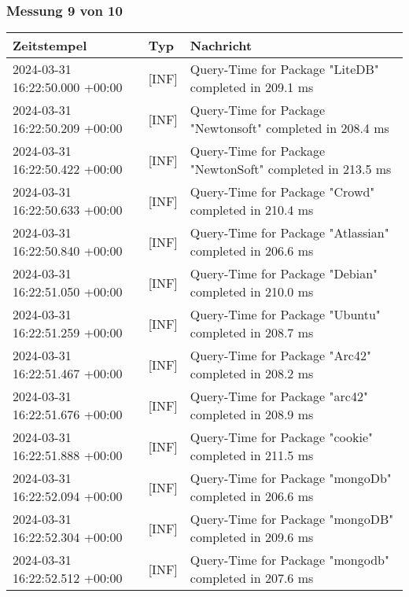     \subsubsection*{Messung 9 von 10} \label{subsubsec:MySQLOhneIndex9von10}
        {
            {\small
                \begin{tabularx}{\textwidth}{|l|l|X|}
                    \hline
                    \textbf{Zeitstempel} & \textbf{Typ} & \textbf{Nachricht} \\
                    \hline
                    \endhead
                    2024-03-31 16:22:50.000 +00:00 & [INF] & Query-Time for Package "LiteDB" completed in 209.1 ms \\
                    2024-03-31 16:22:50.209 +00:00 & [INF] & Query-Time for Package "Newtonsoft" completed in 208.4 ms \\
                    2024-03-31 16:22:50.422 +00:00 & [INF] & Query-Time for Package "NewtonSoft" completed in 213.5 ms \\
                    2024-03-31 16:22:50.633 +00:00 & [INF] & Query-Time for Package "Crowd" completed in 210.4 ms \\
                    2024-03-31 16:22:50.840 +00:00 & [INF] & Query-Time for Package "Atlassian" completed in 206.6 ms \\
                    2024-03-31 16:22:51.050 +00:00 & [INF] & Query-Time for Package "Debian" completed in 210.0 ms \\
                    2024-03-31 16:22:51.259 +00:00 & [INF] & Query-Time for Package "Ubuntu" completed in 208.7 ms \\
                    2024-03-31 16:22:51.467 +00:00 & [INF] & Query-Time for Package "Arc42" completed in 208.2 ms \\
                    2024-03-31 16:22:51.676 +00:00 & [INF] & Query-Time for Package "arc42" completed in 208.9 ms \\
                    2024-03-31 16:22:51.888 +00:00 & [INF] & Query-Time for Package "cookie" completed in 211.5 ms \\
                    2024-03-31 16:22:52.094 +00:00 & [INF] & Query-Time for Package "mongoDb" completed in 206.6 ms \\
                    2024-03-31 16:22:52.304 +00:00 & [INF] & Query-Time for Package "mongoDB" completed in 209.6 ms \\
                    2024-03-31 16:22:52.512 +00:00 & [INF] & Query-Time for Package "mongodb" completed in 207.6 ms \\

\end{tabularx}}}
